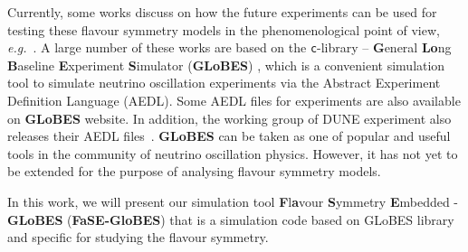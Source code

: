 \documentclass[a4paper,11pt]{article}
\begin{document}
Currently, some works discuss on how the future experiments can be used for testing these flavour symmetry models in the phenomenological point of view, \textit{e.g.}~\cite{Ballett:2016yod,Chatterjee:2017xkb,Ding:2019zhn,Tang:2019edw}. A large number of these works are based on the \texttt{c}-library -- \textbf{G}eneral \textbf{Lo}ng \textbf{B}aseline \textbf{E}xperiment \textbf{S}imulator (\textbf{GLoBES}) \cite{Huber:2004ka,Huber:2007ji}, which is a convenient simulation tool to simulate neutrino oscillation experiments via the Abstract Experiment Definition Language (AEDL). Some AEDL files for experiments are also available on \textbf{GLoBES} website. In addition, the working group of DUNE experiment also releases their AEDL files~\cite{Alion:2016uaj}.  \textbf{GLoBES} can be taken as one of popular and useful tools in the community of neutrino oscillation physics. However, it has not yet to be extended for the purpose of analysing flavour symmetry models. 

In this work, we will present our simulation tool \textbf{F}l\textbf{a}vour \textbf{S}ymmetry \textbf{E}mbedded - \textbf{GLoBES} (\textbf{FaSE-GloBES}) that is a simulation code based on GLoBES library and specific for studying the flavour symmetry. 

\end{document}

